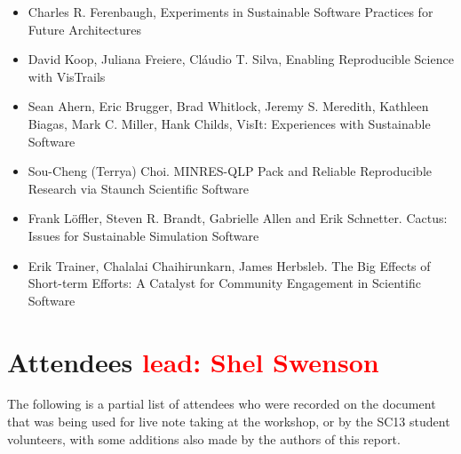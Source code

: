 \documentclass[11pt, oneside]{amsart}
\newcommand{\note}[1]{ {\textcolor{red}    { #1 }}}
\begin{document}
\begin{itemize}

\item Charles R. Ferenbaugh, Experiments in Sustainable Software
  Practices for Future Architectures~\cite{Ferenbaugh_WSSSPE}

\item David Koop, Juliana Freiere, Cl\'{a}udio T. Silva, Enabling
  Reproducible Science with VisTrails~\cite{Koop_WSSSPE}

\item Sean Ahern, Eric Brugger, Brad Whitlock, Jeremy S. Meredith,
  Kathleen Biagas, Mark C. Miller, Hank Childs, VisIt: Experiences
  with Sustainable Software~\cite{Ahern_WSSSPE}

\item Sou-Cheng (Terrya) Choi. MINRES-QLP Pack and Reliable
  Reproducible Research via Staunch Scientific Software~\cite{Choi_WSSSPE}

\item Frank L\"{o}ffler, Steven R. Brandt, Gabrielle Allen and Erik
  Schnetter. Cactus: Issues for Sustainable Simulation Software~\cite{Loffler_WSSSPE}

\item Erik Trainer, Chalalai Chaihirunkarn, James Herbsleb. The Big
  Effects of Short-term Efforts: A Catalyst for Community Engagement
  in Scientific Software~\cite{Trainer_WSSSPE}

\end{itemize}




\section{Attendees \note{lead: Shel Swenson}} \label{sec:attendees}


The following is a partial list of attendees who were recorded on the
document~\cite{WSSSPE1-google-notes} that was being used for live note taking at the workshop, or by the SC13 student volunteers, with some additions also made by the authors of this report.
\end{document}
